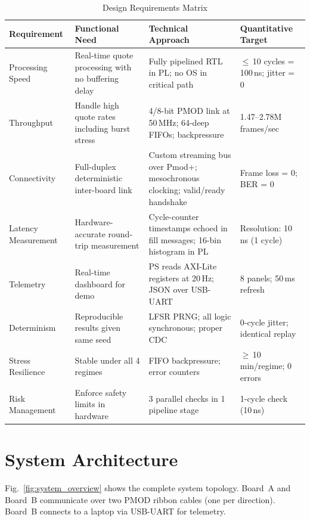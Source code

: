 \documentclass[conference]{IEEEtran}
\begin{document}
\begin{table}[t]
\centering
\caption{Design Requirements Matrix}
\label{tab:requirements}
\begin{tabular}{@{}L{2.2cm}L{4.5cm}L{5cm}L{4.5cm}@{}}
\toprule
\textbf{Requirement} & \textbf{Functional Need} & \textbf{Technical Approach} & \textbf{Quantitative Target} \\
\midrule
Processing Speed & Real-time quote processing with no buffering delay & Fully pipelined RTL in PL; no OS in critical path & $\leq$\,10 cycles = 100\,ns; jitter = 0 \\
\addlinespace
Throughput & Handle high quote rates including burst stress & 4/8-bit PMOD link at 50\,MHz; 64-deep FIFOs; backpressure & 1.47--2.78M frames/sec \\
\addlinespace
Connectivity & Full-duplex deterministic inter-board link & Custom streaming bus over Pmod+; mesochronous clocking; valid/ready handshake & Frame loss = 0; BER = 0 \\
\addlinespace
Latency Measurement & Hardware-accurate round-trip measurement & Cycle-counter timestamps echoed in fill messages; 16-bin histogram in PL & Resolution: 10\,ns (1 cycle) \\
\addlinespace
Telemetry & Real-time dashboard for demo & PS reads AXI-Lite registers at 20\,Hz; JSON over USB-UART & 8 panels; 50\,ms refresh \\
\addlinespace
Determinism & Reproducible results given same seed & LFSR PRNG; all logic synchronous; proper CDC & 0-cycle jitter; identical replay \\
\addlinespace
Stress Resilience & Stable under all 4 regimes & FIFO backpressure; error counters & $\geq$\,10\,min/regime; 0 errors \\
\addlinespace
Risk Management & Enforce safety limits in hardware & 3 parallel checks in 1 pipeline stage & 1-cycle check (10\,ns) \\
\bottomrule
\end{tabular}
\end{table}

\section{System Architecture}

Fig.~\ref{fig:system_overview} shows the complete system topology. Board~A and Board~B communicate over two PMOD ribbon cables (one per direction). Board~B connects to a laptop via USB-UART for telemetry.
\end{document}
